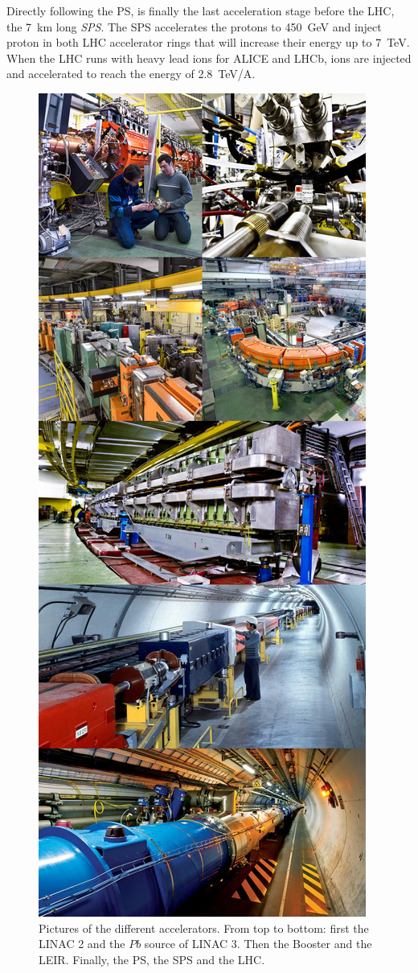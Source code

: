 	Directly following the PS, is finally the last acceleration stage before the LHC, the \SI{7}{km} long \textit{SPS}. The SPS accelerates the protons to \SI{450}{GeV} and inject proton in both LHC accelerator rings that will increase their energy up to \SI{7}{TeV}. When the LHC runs with heavy lead ions for ALICE and LHCb, ions are injected and accelerated to reach the energy of \SI{2.8}{TeV/A}.

	\begin{figure}[H]
		\centering
		\includegraphics[width=0.5\linewidth]{fig/chapt2/CERN-accelerators.jpg}
		\caption{\label{fig:CERNAccelerators} Pictures of the different accelerators. From top to bottom: first the LINAC 2 and the $Pb$ source of LINAC 3. Then the Booster and the LEIR. Finally, the PS, the SPS and the LHC.}
	\end{figure}
	
